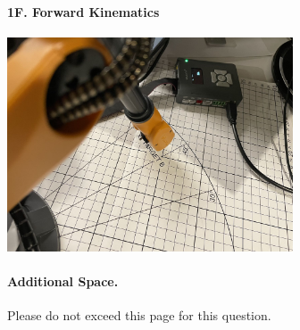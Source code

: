 \paragraph{1F. Forward Kinematics}
\begin{center}
    \includegraphics[height=2.5in]{image/1f_joint_targetb.jpg}
\end{center}

\newpage

\paragraph{Additional Space.}
Please do not exceed this page for this question.
